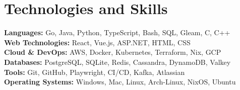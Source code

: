 \documentclass[10pt,a4paper]{article}
\begin{document}
	\section{Technologies and Skills}
	\textbf{Languages:} Go, Java, Python, TypeScript, Bash, SQL, Gleam, C, C++ \\
	\textbf{Web Technologies:} React, Vue.js, ASP.NET, HTML, CSS \\
	\textbf{Cloud \& DevOps:} AWS, Docker, Kubernetes, Terraform, Nix, GCP \\
	\textbf{Databases:} PostgreSQL, SQLite, Redis, Cassandra, DynamoDB, Valkey \\
	\textbf{Tools:} Git, GitHub, Playwright, CI/CD, Kafka, Atlassian \\
	\textbf{Operating Systems:} Windows, Mac, Linux, Arch-Linux, NixOS, Ubuntu \\
	
\end{document}
